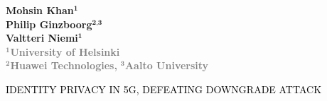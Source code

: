 \documentclass[portrait,a0]{a0poster}
\begin{document}
\hspace{1.65cm}
\begin{minipage}[t]{.95\linewidth} %
\vspace{-110pt} %
\begin{flushright}
\textsf{\bfseries
Mohsin Khan$^\textbf{1}$ 
\\
Philip Ginzboorg$^\textbf{2,3}$\\
Valtteri Niemi$^\textbf{1}$\\
} %
\textcolor{gray}{\textsf{\bfseries{$^\textbf{1}$University of Helsinki}}}\\
\textcolor{gray}{\textsf{\bfseries{$^\textbf{2}$Huawei Technologies,}}}
\textcolor{gray}{\textsf{\bfseries{$^\textbf{3}$Aalto University}}}\\
\end{flushright}
\end{minipage}


\vspace{20pt}

\begin{center}
 {\Huge{}\textcolor{black}{\MakeUppercase{Identity Privacy in 5G, Defeating Downgrade Attack}} \MakeUppercase{}}
\end{center}

\noindent\makebox[\linewidth]{\rule{\paperwidth}{8pt}}
\end{document}

